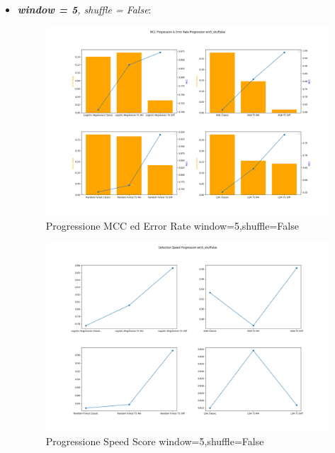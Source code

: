 \begin{itemize}
    \newpage
    \item \textit{\textbf{window = 5}, shuffle = False}:
    \begin{figure}[H]
    \centering
    \includegraphics[width=0.94\linewidth]{MCC_Progression_win5_shufFalse.png}
    \caption{Progressione MCC ed Error Rate window=5,shuffle=False}
    \label{fig:enter-label}
    \end{figure}
    \begin{figure}[H]
    \centering
    \includegraphics[width=0.94\linewidth]{Speed_Progression_win5_shufFalse.png}
    \caption{Progressione Speed Score window=5,shuffle=False}
    \label{fig:enter-label}
    \end{figure}


\end{itemize}

